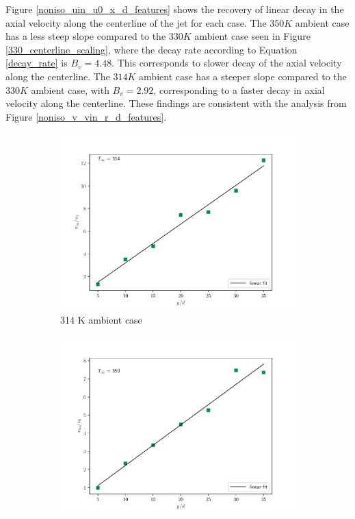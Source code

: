 Figure \ref{noniso_uin_u0_x_d_features} shows the recovery of linear decay in the axial velocity along the centerline of the jet for each case. The $350 K$ ambient case has a less steep slope compared to the $330 K$ ambient case seen in Figure \ref{330_centerline_scaling}, where the decay rate according to Equation \ref{decay_rate} is $B_v = 4.48$. This corresponds to slower decay of the axial velocity along the centerline. The $314 K$ ambient case has a steeper slope compared to the $330 K$ ambient case, with $B_v = 2.92$, corresponding to a faster decay in axial velocity along the centerline. These findings are consistent with the analysis from Figure \ref{noniso_v_vin_r_d_features}. 
\begin{figure}[htbp!]
\begin{center}
\begin{subfigure}{0.45\textwidth}
	\includegraphics[scale=.45]{figures/Plots/radial/slices_5/314_ambient/uin_u0_vs_x_d.pdf}
	\caption{314 K ambient case} \label{noniso_uin_u0_x_c_1}
\end{subfigure}
\begin{subfigure}{0.45\textwidth}
	\includegraphics[scale=.45]{figures/Plots/radial/slices_5/350_ambient/uin_u0_vs_x_d.pdf}

\end{subfigure}
\end{center}
\end{figure}
